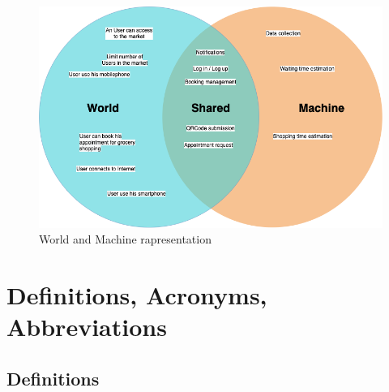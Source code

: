 \begin{figure}[H]
  \caption{World and Machine rapresentation}
  \label{fig:Reservation}
  \centering
  \includegraphics[scale = 0.38]{diagrams/VENN.png}
\end{figure}


\section{Definitions, Acronyms, Abbreviations}
\subsection{Definitions}

